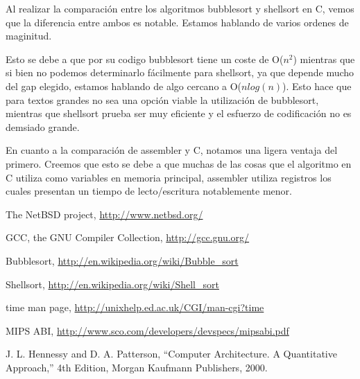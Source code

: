 \documentclass{article}
\begin{document}
	Al realizar la comparación entre los algoritmos bubblesort y shellsort en C, vemos que la diferencia entre ambos es notable. Estamos hablando de varios ordenes de maginitud.
	\par
	Esto se debe a que por su codigo bubblesort tiene un coste de O($n^2$) mientras que si bien no podemos determinarlo fácilmente para shellsort, ya que depende mucho del gap elegido, estamos hablando de algo cercano a O($n log(n)$). Esto hace que para textos grandes no sea una opción viable la utilización de bubblesort, mientras que shellsort prueba ser muy eficiente y el esfuerzo de codificación no es demsiado grande.
	\par
	En cuanto a la comparación de assembler y C, notamos una ligera ventaja del primero. Creemos que esto se debe a que muchas de las cosas que el algoritmo en C utiliza como variables en memoria principal, assembler utiliza registros los cuales presentan un tiempo de lecto/escritura notablemente menor.
\bigskip\bigskip




\begin{thebibliography}{99}

	 The NetBSD project, \url{http://www.netbsd.org/}

	 GCC, the GNU Compiler Collection, \url{http://gcc.gnu.org/}

	 Bubblesort, \url{http://en.wikipedia.org/wiki/Bubble_sort}

	 Shellsort, \url{http://en.wikipedia.org/wiki/Shell_sort}

	 time man page, \url{http://unixhelp.ed.ac.uk/CGI/man-cgi?time}

	 MIPS ABI, \url{http://www.sco.com/developers/devspecs/mipsabi.pdf}

	 J. L. Hennessy and D. A. Patterson, ``Computer Architecture. A Quantitative
	Approach,'' 4th Edition, Morgan Kaufmann Publishers, 2000.

	\end{thebibliography}

\newpage
\end{document}
